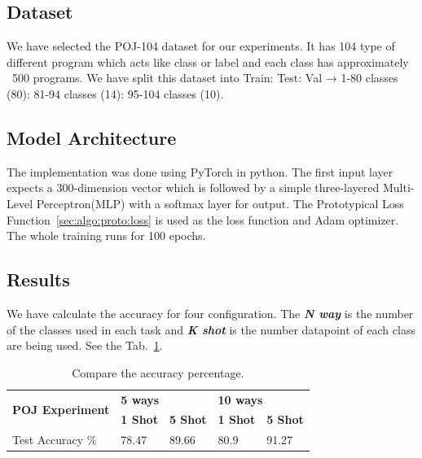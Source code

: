 \subsection{Dataset}
We have selected the POJ-104 dataset\cite{tbcnn-aaai16} for our experiments. It has 104 type of different program which acts like class or label and each class has approximately ~500 programs. We have split this dataset into Train: Test: Val →  1-80 classes (80): 81-94 classes (14): 95-104 classes (10).

\subsection{Model Architecture}
The implementation was done using PyTorch in python. The first input layer expects a 300-dimension vector which is followed by a simple three-layered Multi-Level Perceptron(MLP) with a softmax layer for output. The Prototypical Loss Function~\ref{sec:algo:proto:loss} is used as the loss function and Adam optimizer. The whole training runs for 100 epochs.

\subsection{Results}
We have calculate the accuracy for four configuration. The \textit{\textbf{N way}} is the number of the classes used in each task and \textit{\textbf{K shot}} is the number datapoint  of each class are being used. See the Tab.~\ref{tab:unsupervised-acc}.
\begin{table}[h]
\begin{tabular}{lllll}
\hline
\multirow{2}{*}{\textbf{POJ Experiment}} & \multicolumn{2}{l}{\textbf{5 ways}} & \multicolumn{2}{l}{\textbf{10 ways}} \\
 & \textbf{1 Shot} & \textbf{5 Shot} & \textbf{1 Shot} & \textbf{5 Shot} \\
\hline
Test Accuracy \% & 78.47 & 89.66 & 80.9 & 91.27 \\
\hline
\end{tabular}
\centering
\caption{Compare the accuracy percentage.}
\label{tab:unsupervised-acc}
\end{table}

